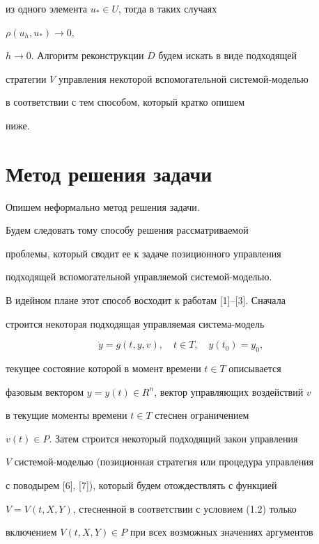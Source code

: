из одного элемента $u_*\in U$, тогда в таких случаях 


$\rho(u_h,u_*)\to 0$, 


$h\to 0$. Алгоритм реконструкции $D$ будем искать в виде подходящей 


стратегии $V$ управления некоторой вспомогательной системой-моделью 


в соответствии с тем способом, который кратко опишем 


ниже. 


 


\section{Метод решения задачи} 


 


Опишем неформально метод решения задачи. 


Будем следовать тому способу решения рассматриваемой 


проблемы, который сводит ее к задаче позиционного управления 


подходящей вспомогательной управляемой системой-моделью. 


В идейном плане этот способ восходит к работам [1]--[3]. Сначала 


строится некоторая подходящая управляемая система-модель 


\begin{equation} 


\Dot y=g(t,y,v),\quad t\in T,\quad y(t_0)=y_0, 


\end{equation} 


текущее состояние которой в момент времени $t\in T$ описывается 


фазовым вектором $y=y(t)\in R^n$, вектор управляющих воздействий $v$ 


в текущие моменты времени $t\in T$ стеснен ограничением 


$v(t)\in P$. Затем строится некоторый подходящий закон управления 


$V$ системой-моделью (позиционная стратегия или процедура управления 


с поводырем [6], [7]), который будем отождествлять с функцией 


$V=V(t,X,Y)$, стесненной в соответствии с условием (1.2) только 


включением $V(t,X,Y)\in P$ при всех возможных значениях аргументов 


